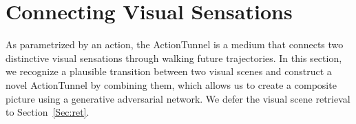 \documentclass[10pt,twocolumn,letterpaper]{article}
\begin{document}



\section{Connecting Visual Sensations} \label{Sec:connection}
As parametrized by an action, the ActionTunnel is a medium that connects two distinctive visual sensations through walking future trajectories. In this section, we recognize a plausible transition between two visual scenes and construct a novel ActionTunnel by combining them, which allows us to create a composite picture using a generative adversarial network. We defer the visual scene retrieval to Section~\ref{Sec:ret}. 
\end{document}
